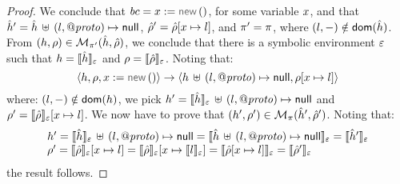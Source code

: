 \begin{proof}
\noindent{}
We conclude that $\bcmd = \jvar := \jsilnew()$, for some variable $\jvar$, and that
$\sheap' = \sheap \dunion \hcell{\loc}{\protop}{\jsnull}$, $\sstore' = \sstore[\jvar \mapsto \loc]$, and $\pc' = \pc$, 
 where  $(\loc,-) \notin \domain (\sheap)$. 
 From $(\heap, \store) \in \smodels{\sheap, \sstore}{\pc'}$, we conclude that there is a symbolic environment
$\senv$ such that $\heap = \semexpr{\sheap}{\senv}$ and $\store = \semexpr{\sstore}{\senv}$. 
Noting that: 
$$
\semtrans{\heap, \store, \jvar := \jsilnew()}{\heap \dunion \hcell{\loc}{\protop}{\jsnull}, \store[\jvar \mapsto \loc]}
$$
where: $(\loc,-) \notin \domain (\heap)$, we pick $\heap' = \semexpr{\sheap}{\senv} \dunion \hcell{\loc}{\protop}{\jsnull}$ 
and $\store' = \semexpr{\sstore}{\senv}[\jvar \mapsto \loc]$. 
We now have to prove that $(\heap', \store') \in \smodels{\sheap', \sstore'}{\pc}$.
Noting that: 
$$
\begin{array}{l}
\heap' = \semexpr{\sheap}{\senv} \dunion \hcell{\loc}{\protop}{\jsnull} = \semexpr{\sheap \dunion \hcell{\loc}{\protop}{\jsnull}}{\senv}   
     = \semexpr{\sheap'}{\senv}  \\
%
\store' = \semexpr{\sstore}{\senv}[\jvar \mapsto \loc] = \semexpr{\sstore}{\senv}[\jvar \mapsto \symbeval{\loc}{\senv}] = 
      \semexpr{\sstore[\jvar \mapsto \loc]}{\senv} = \semexpr{\sstore'}{\senv} 
\end{array}
$$
the result follows. 
\vspace{6pt}


\end{proof}
